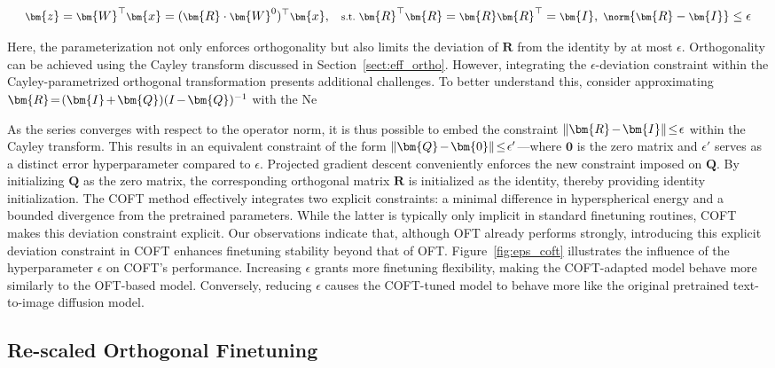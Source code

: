 \begin{equation}\label{eq:coft_general}
    \footnotesize
    \bm{z}=\bm{W}^\top\bm{x}=(\bm{R}\cdot\bm{W}^0)^\top\bm{x},~~~\text{s.t.}~\bm{R}^\top\bm{R}=\bm{R}\bm{R}^\top=\bm{I},~\norm{\bm{R}-\bm{I}}\leq \epsilon
\end{equation}

Here, the parameterization not only enforces orthogonality but also limits the deviation of $\bm{R}$ from the identity by at most $\epsilon$. Orthogonality can be achieved using the Cayley transform discussed in Section~\ref{sect:eff_ortho}. However, integrating the $\epsilon$-deviation constraint within the Cayley-parametrized orthogonal transformation presents additional challenges. To better understand this, consider approximating $\thickmuskip=2mu \medmuskip=2mu \bm{R}=(\bm{I}+\bm{Q})(I-\bm{Q})^{-1}$ with the Ne

As the series converges with respect to the operator norm, it is thus possible to embed the constraint $\thickmuskip=2mu \medmuskip=2mu\|\bm{R}-\bm{I}\|\leq\epsilon$ within the Cayley transform. This results in an equivalent constraint of the form $\thickmuskip=2mu \medmuskip=2mu \|\bm{Q}-\bm{0}\|\leq\epsilon'$—where $\bm{0}$ is the zero matrix and $\epsilon'$ serves as a distinct error hyperparameter compared to $\epsilon$. Projected gradient descent conveniently enforces the new constraint imposed on $\bm{Q}$. By initializing $\bm{Q}$ as the zero matrix, the corresponding orthogonal matrix $\bm{R}$ is initialized as the identity, thereby providing identity initialization. The COFT method effectively integrates two explicit constraints: a minimal difference in hyperspherical energy and a bounded divergence from the pretrained parameters. While the latter is typically only implicit in standard finetuning routines, COFT makes this deviation constraint explicit. Our observations indicate that, although OFT already performs strongly, introducing this explicit deviation constraint in COFT enhances finetuning stability beyond that of OFT. Figure~\ref{fig:eps_coft} illustrates the influence of the hyperparameter $\epsilon$ on COFT's performance. Increasing $\epsilon$ grants more finetuning flexibility, making the COFT-adapted model behave more similarly to the OFT-based model. Conversely, reducing $\epsilon$ causes the COFT-tuned model to behave more like the original pretrained text-to-image diffusion model.

\subsection{Re-scaled Orthogonal Finetuning}

